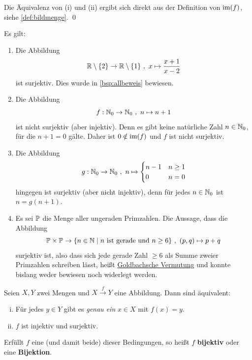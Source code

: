 \begin{bew}
    Die Äquivalenz von (i) und (ii) ergibt sich direkt aus der Definition von $\operatorname{im}(f)$, siehe \cref{def:bildmenge}. \qed
\end{bew}


\begin{bsp} \label{bsp:surjektiv}
    Es gilt:
    \begin{enumerate}
        \item Die Abbildung
            \[ \mathbb R \setminus \{2\} \to \mathbb R \setminus \{1\} \ ,\ x \mapsto \frac{x+1}{x-2} \]
        ist surjektiv. Dies wurde in \cref{bsp:allbeweis} bewiesen.
        \item Die Abbildung
            \[ f:\mathbb N_0 \to \mathbb N_0 \ ,\ n \mapsto n+1 \]
        ist nicht surjektiv (aber injektiv). Denn es gibt keine natürliche Zahl $n\in \mathbb N_0$, für die $n+1=0$ gälte. Daher ist $0\notin \operatorname{im}(f)$ und $f$ ist nicht surjektiv.
        \item Die Abbildung
            \[ g: \mathbb N_0 \to \mathbb N_0\ ,\ n \mapsto \begin{cases}
                n-1 & n\ge 1 \\
                0 & n=0
            \end{cases}\]
        hingegen ist surjektiv (aber nicht injektiv), denn für jedes $n \in \mathbb N_0$ ist $n=g(n+1)$.
        \item Es sei $\mathbb P$ die Menge aller ungeraden Primzahlen. Die Aussage, dass die Abbildung
            \[ \mathbb P \times \mathbb P \to \{n\in \mathbb N \mid n\ \text{ist gerade und}\ n\ge 6\} \ ,\ (p,q) \mapsto p+q \]
        surjektiv ist, also dass sich jede gerade Zahl $\ge 6$ als Summe zweier Primzahlen schreiben lässt, heißt \href{https://de.wikipedia.org/wiki/Goldbachsche_Vermutung}{Goldbachsche Vermutung} und konnte bislang weder bewiesen noch widerlegt werden.
    \end{enumerate}
\end{bsp}


\begin{de} \label{def:bijektiv} 
    Seien $X,Y$ zwei Mengen und $X\xrightarrow{f} Y$ eine Abbildung. Dann sind äquivalent:
    \begin{enumerate}[(i)]
        \item Für jedes $y\in Y$ gibt es \emph{genau ein} $x\in X$ mit $f(x)=y$.
        \item $f$ ist injektiv und surjektiv.
    \end{enumerate}
    Erfüllt $f$ eine (und damit beide) dieser Bedingungen, so heißt $f$ \textbf{bijektiv} oder eine \textbf{Bijektion}.
\end{de}


